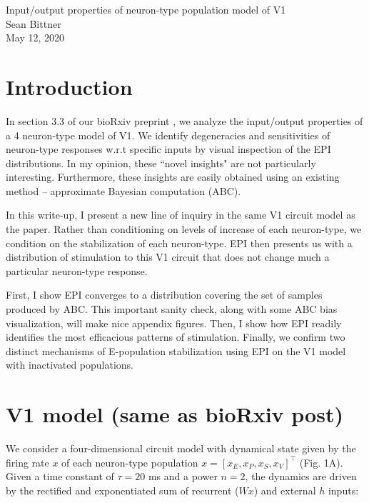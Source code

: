 \documentclass[11pt]{article}
\begin{document}
\medskip                        %

\thispagestyle{plain}
\begin{center}                  %
{\Large Input/output properties of neuron-type population model of V1} \\
Sean Bittner \\
May 12, 2020 \\
\end{center}

\section{Introduction}
In section 3.3 of our bioRxiv preprint \cite{bittner2019interrogating}, we analyze the input/output properties of a 4 neuron-type model of V1.  
We identify degeneracies and sensitivities of neuron-type responses w.r.t specific inputs by visual inspection of the EPI distributions.  
In my opinion, these ``novel insights" are not particularly interesting.
Furthermore, these insights are easily obtained using an existing method -- approximate Bayesian computation (ABC).  

In this write-up, I present a new line of inquiry in the same V1 circuit model as the paper.
Rather than conditioning on levels of increase of each neuron-type, we condition on the stabilization of each neuron-type.
EPI then presents us with a distribution of stimulation to this V1 circuit that does not change much a particular neuron-type response.

First, I show EPI converges to a distribution covering the set of samples produced by ABC.
This important sanity check, along with some ABC bias visualization, will make nice appendix figures.
Then, I show how EPI readily identifies the most efficacious patterns of stimulation.
Finally, we confirm two distinct mechanisms of E-population stabilization using EPI on the V1 model with inactivated populations.

\section{V1 model (same as bioRxiv post)}
We consider a four-dimensional circuit model with dynamical state given by the firing rate $x$ of each neuron-type population $x = \left[x_E, x_P , x_S, x_V \right]^\top$ (Fig. 1A). 
Given a time constant of $\tau = 20$ ms and a power $n = 2$, the dynamics are driven by the rectified and exponentiated sum of recurrent ($Wx$) and external $h$ inputs:
\end{document}
